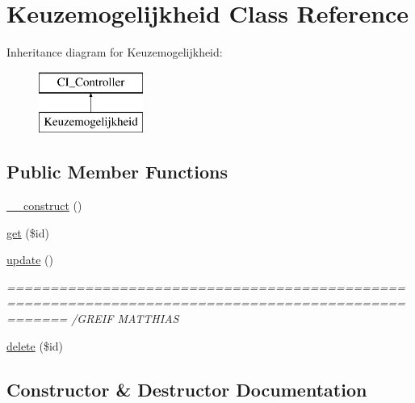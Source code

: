 \hypertarget{class_keuzemogelijkheid}{}\section{Keuzemogelijkheid Class Reference}
\label{class_keuzemogelijkheid}
Inheritance diagram for Keuzemogelijkheid\+:\begin{figure}[H]
\begin{center}
\leavevmode
\includegraphics[height=2.000000cm]{class_keuzemogelijkheid}
\end{center}
\end{figure}
\subsection*{Public Member Functions}
\begin{DoxyCompactItemize}
\item 
\mbox{\hyperlink{class_keuzemogelijkheid_a095c5d389db211932136b53f25f39685}{\+\_\+\+\_\+construct}} ()
\item 
\mbox{\hyperlink{class_keuzemogelijkheid_a50e3bfb586b2f42932a6a93f3fbb0828}{get}} (\$id)
\item 
\mbox{\hyperlink{class_keuzemogelijkheid_a842e4774e3b3601a005b995c02f7e883}{update}} ()
\begin{DoxyCompactList}\small\item\em =================================================================================================== /\+G\+R\+E\+IF M\+A\+T\+T\+H\+I\+AS \end{DoxyCompactList}\item 
\mbox{\hyperlink{class_keuzemogelijkheid_a2f8258add505482d7f00ea26493a5723}{delete}} (\$id)
\end{DoxyCompactItemize}


\subsection{Constructor \& Destructor Documentation}
\mbox{\label{class_keuzemogelijkheid_a095c5d389db211932136b53f25f39685}} 
